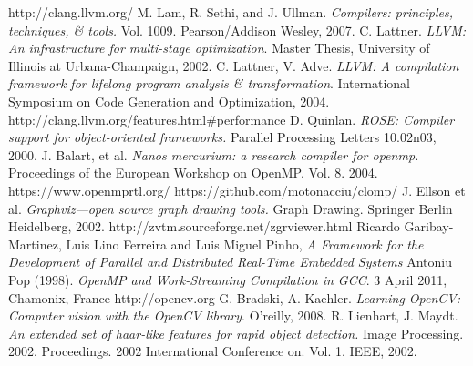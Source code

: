 \documentclass[a4paper,12pt,oneside]{book}
\begin{document}
\begin{thebibliography}{30}
http://clang.llvm.org/
 M. Lam, R. Sethi, and J. Ullman. \emph{Compilers: principles, techniques, \& tools.} Vol. 1009. Pearson/Addison Wesley, 2007.
 C. Lattner. \emph{LLVM: An infrastructure for multi-stage optimization}. Master Thesis, University of Illinois at Urbana-Champaign, 2002.
 C. Lattner, V. Adve. \emph{LLVM: A compilation framework for lifelong program analysis \& transformation}. International Symposium on Code Generation and Optimization, 2004. 
http://clang.llvm.org/features.html\#performance
 D. Quinlan. \emph{ROSE: Compiler support for object-oriented frameworks.} Parallel Processing Letters 10.02n03, 2000.
 J. Balart, et al. \emph{Nanos mercurium: a research compiler for openmp.} Proceedings of the European Workshop on OpenMP. Vol. 8. 2004.
https://www.openmprtl.org/
https://github.com/motonacciu/clomp/
 J. Ellson et al. \emph{Graphviz—open source graph drawing tools.} Graph Drawing. Springer Berlin Heidelberg, 2002.
http://zvtm.sourceforge.net/zgrviewer.html
 Ricardo Garibay-Martinez, Luis Lino Ferreira and Luis Miguel Pinho, \emph{A Framework for the Development of Parallel and Distributed Real-Time Embedded Systems}
Antoniu Pop (1998). \emph{OpenMP and Work-Streaming Compilation in GCC}. 3 April 2011, Chamonix, France
http://opencv.org
G. Bradski, A. Kaehler. \emph{Learning OpenCV: Computer vision with the OpenCV library}. O'reilly, 2008.
R. Lienhart, J. Maydt. \emph{An extended set of haar-like features for rapid object detection.} Image Processing. 2002. Proceedings. 2002 International Conference on. Vol. 1. IEEE, 2002.

\end{thebibliography}
\end{document}
